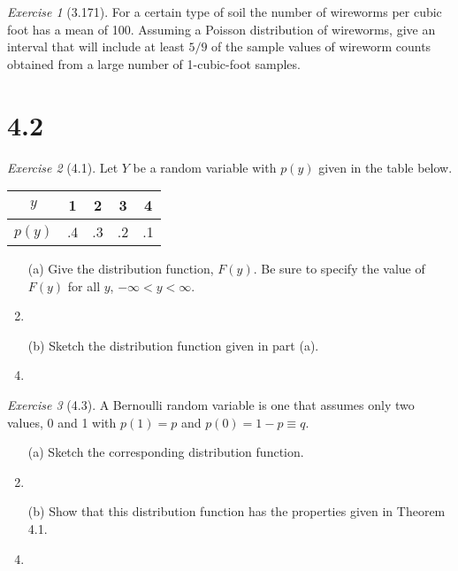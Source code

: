 \documentclass[12pt]{amsart}
\makeatletter
\theoremstyle{remark}
\newtheorem*{exercise}{Exercise}%
\renewenvironment{proof}[1][\proofname]{\par\doublespacing
  \pushQED{\qed}%
  \normalfont \topsep6\p@\@plus6\p@\relax
  \list{}{%
    \settowidth{\leftmargin}{\itshape\proofname:\hskip\labelsep}%
    \setlength{\labelwidth}{0pt}%
    \setlength{\itemindent}{-\leftmargin}%
  }%
  \item[\hskip\labelsep\itshape#1\@addpunct{:}]\ignorespaces
}{%
  \popQED\endlist\@endpefalse
  \singlespacing
}
\theoremstyle{mycomment}
\makeatother
\begin{document}
\begin{exercise}[3.171]
For a certain type of soil the number of wireworms per cubic foot has a mean of 100. Assuming a Poisson distribution of wireworms, give an interval that will include at least $5/9$ of the sample values of wireworm counts obtained from a large number of 1-cubic-foot samples.

\begin{proof}[Solution]
 
\end{proof}
\end{exercise}

\section*{4.2}
\begin{exercise}[4.1]
Let $Y$ be a random variable with $p(y)$ given in the table below.
\begin{center}
\begin{tabular}{c|cccc}
$y$ & 1 & 2 & 3 & 4 \\
\hline
$p(y)$ & .4 & .3 & .2 & .1
\end{tabular}
\end{center}

\begin{enumerate}
    \item[(a)] Give the distribution function, $F(y)$. Be sure to specify the value of $F(y)$ for all $y$, $-\infty < y < \infty$.
\begin{proof}[Solution]
 
\end{proof}
    \item[(b)] Sketch the distribution function given in part (a).
\begin{proof}[Solution]
 
\end{proof}
\end{enumerate} 
\end{exercise}

\begin{exercise}[4.3]
A Bernoulli random variable is one that assumes only two values, 0 and 1 with $p(1) = p$ and $p(0) = 1 - p \equiv q$.

\begin{enumerate}
    \item[(a)] Sketch the corresponding distribution function.
\begin{proof}[Solution]
 
\end{proof}
    \item[(b)] Show that this distribution function has the properties given in Theorem 4.1.
\begin{proof}[Solution]
 
\end{proof}
\end{enumerate} 
\end{exercise}
\end{document}
